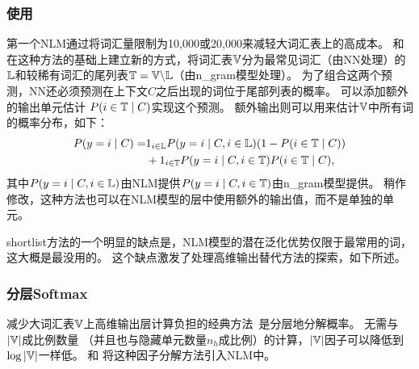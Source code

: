 \subsubsection{使用}
第一个\gls{NLM}\citep{BenDucVin01-small,Bengio-nnlm2003-small}通过将词汇量限制为10,000或20,000来减轻大词汇表上的高成本。
\citet{Schwenk+Gauvain2002}和 \citet{Schwenk-2007}在这种方法的基础上建立新的方式，将词汇表$\mathbb{V}$分为最常见词汇（由\gls{NN}处理）的~$\mathbb{L}$和较稀有词汇的尾列表$\mathbb{T} = \mathbb{V} \backslash \mathbb{L}$（由\gls{n_gram}模型处理）。
为了组合这两个预测，\gls{NN}还必须预测在上下文$C$之后出现的词位于尾部列表的概率。
可以添加额外的输出单元估计 $P(i \in \mathbb{T} \mid C)$实现这个预测。
额外输出则可以用来估计$\mathbb{V}$中所有词的概率分布，如下：
\begin{align}
 P(y=i\mid C)  =& 1_{i \in \mathbb{L}} P(y=i\mid C, i \in \mathbb{L}) (1 - P(i \in \mathbb{T}\mid C)) \nonumber \\
     & + 1_{i \in \mathbb{T}} P(y=i\mid C, i \in \mathbb{T}) P(i \in \mathbb{T}\mid C),
\end{align}
其中$P(y=i\mid C, i \in \mathbb{L})$由\gls{NLM}提供$P(y=i\mid C, i \in \mathbb{T})$由\gls{n_gram}模型提供。
稍作修改，这种方法也可以在\gls{NLM}模型的层中使用额外的输出值，而不是单独的单元。

\gls{shortlist}方法的一个明显的缺点是，\gls{NLM}模型的潜在泛化优势仅限于最常用的词，这大概是最没用的。
这个缺点激发了处理高维输出替代方法的探索，如下所述。

\subsubsection{分层Softmax}
减少大词汇表$\mathbb{V}$上高维输出层计算负担的经典方法~\citep{Goodman2001}是分层地分解概率。
无需与$|\mathbb{V}|$成比例数量 （并且也与隐藏单元数量$n_h$成比例）的计算，$|\mathbb{V}|$因子可以降低到$\log |\mathbb{V}|$一样低。
\citet{BengioTR1215}和\citet{Morin+Bengio-2005-small} 将这种因子分解方法引入\gls{NLM}中。


